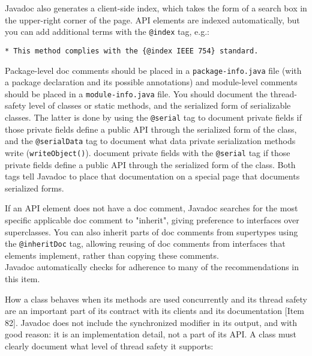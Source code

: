 \documentclass[8pt, table, xcdraw]{article}%
\begin{document}
Javadoc also generates a client-side index, which takes the form of a search box in the upper-right corner of the page. API elements are indexed automatically, but you can add additional terms with the \lstinline{@index} tag, e.g.:

\begin{lstlisting}
* This method complies with the {@index IEEE 754} standard.
\end{lstlisting}

Package-level doc comments should be placed in a \lstinline{package-info.java} file (with a package declaration and its possible annotations) and module-level comments should be placed in a \lstinline{module-info.java} file. You should document the thread-safety level of classes or static methods, and the serialized form of serializable classes. The latter is done by using the \lstinline{@serial} tag to document private fields if those private fields define a public API through the serialized form of the class, and the \lstinline{@serialData} tag to document what data private serialization methods write (\lstinline{writeObject()}). document private fields with the \lstinline{@serial} tag if those private fields define a public API through the serialized form of the class. Both tags tell Javadoc to place that documentation on a special page that documents serialized forms.

If an API element does not have a doc comment, Javadoc searches for the most specific applicable doc comment to "inherit", giving preference to interfaces over superclasses. You can also inherit parts of doc comments from supertypes using the \lstinline{@inheritDoc}
tag, allowing reusing of doc comments from interfaces that elements implement, rather than copying these comments.\\
Javadoc automatically checks for adherence to many of the recommendations in this item.

How a class behaves when its methods are used concurrently and its thread safety are an important part of its contract with its clients and its documentation [Item 82]. Javadoc does not include the synchronized modifier in its output, and with good reason: it is an implementation detail, not a part of its API. A class must clearly document what level of thread safety it supports:
\end{document}

